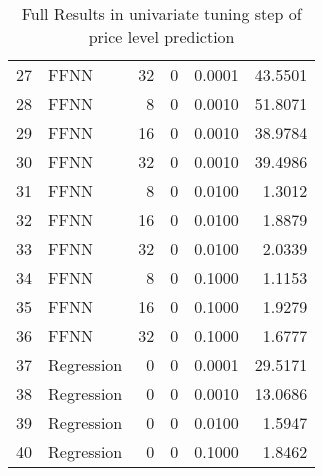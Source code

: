 \begin{table}[ht]
\begin{tabular}{rlrrrr}
  27 & FFNN &    32 &     0 & 0.0001 & 43.5501 \\ 
  28 & FFNN &     8 &     0 & 0.0010 & 51.8071 \\ 
  29 & FFNN &    16 &     0 & 0.0010 & 38.9784 \\ 
  30 & FFNN &    32 &     0 & 0.0010 & 39.4986 \\ 
  31 & FFNN &     8 &     0 & 0.0100 & 1.3012 \\ 
  32 & FFNN &    16 &     0 & 0.0100 & 1.8879 \\ 
  33 & FFNN &    32 &     0 & 0.0100 & 2.0339 \\ 
  34 & FFNN &     8 &     0 & 0.1000 & 1.1153 \\ 
  35 & FFNN &    16 &     0 & 0.1000 & 1.9279 \\ 
  36 & FFNN &    32 &     0 & 0.1000 & 1.6777 \\ 
  37 & Regression &     0 &     0 & 0.0001 & 29.5171 \\ 
  38 & Regression &     0 &     0 & 0.0010 & 13.0686 \\ 
  39 & Regression &     0 &     0 & 0.0100 & 1.5947 \\ 
  40 & Regression &     0 &     0 & 0.1000 & 1.8462 \\ 
   \hline
\end{tabular}
\caption{Full Results in univariate tuning step of price level prediction} 
\label{tab:level.par.tuning.full}
\end{table}
